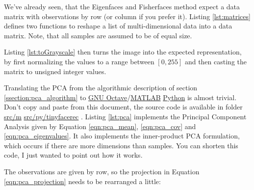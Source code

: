 \ifx\python\undefined
\else
	We've already seen, that the Eigenfaces and Fisherfaces method expect a data matrix with observations by row (or column if you prefer it). Listing \ref{lst:matrices} defines two functions to reshape a list of multi-dimensional data into a data matrix. Note, that all samples are assumed to be of equal size.

	
\fi

\ifx\python\undefined
	Listing \ref{lst:toGrayscale} then turns the image into the expected representation, by first normalizing the values to a range between $[0,255]$ and then casting the matrix to unsigned integer values.
	
	
\fi

Translating the PCA from the algorithmic description of section \ref{ssection:pca_algorithm} to \ifx\python\undefined \href{http://www.gnu.org/software/octave/}{GNU Octave}/\href{http://www.mathworks.com}{MATLAB} \else \href{http://www.python.org}{Python} \fi is almost trivial. Don't copy and paste from this document, the source code is available in folder \ifx\python\undefined \href{src/m}{src/m} \else \href{src/py/tinyfacerec}{src/py/tinyfacerec} \fi. Listing \ref{lst:pca} implements the Principal Component Analysis given by Equation \ref{eqn:pca_mean}, \ref{eqn:pca_cov} and \ref{eqn:pca_eigenvalues}. It also implements the inner-product PCA formulation, which occurs if there are more dimensions than samples. You can shorten this code, I just wanted to point out how it works.

\ifx\python\undefined
	
\else
	
\fi

The observations are given by row, so the projection in Equation \ref{eqn:pca_projection} needs to be rearranged a little:
\ifx\python\undefined
	
\else
	
\fi

